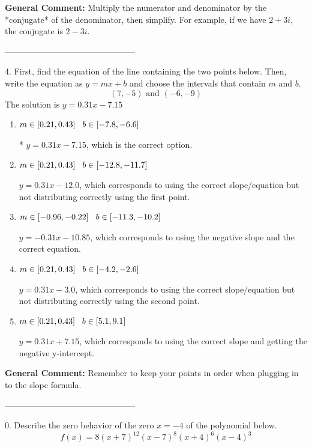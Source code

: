 \documentclass{extbook}[14pt]
\begin{document}
\textbf{General Comment:} Multiply the numerator and denominator by the *conjugate* of the denominator, then simplify. For example, if we have $2+3i$, the conjugate is $2-3i$. 

-----------------------------------------------

4. First, find the equation of the line containing the two points below. Then, write the equation as $ y=mx+b $ and choose the intervals that contain $m$ and $b$.
\[ (7, -5) \text{ and } (-6, -9) \] 
The solution is $ y = 0.31x -7.15 $ 

\begin{enumerate}[label=\Alph*.] 
\item $ m \in [0.21, 0.43] \hspace*{3mm} b \in [-7.8, -6.6] $ 

 * $y = 0.31x -7.15$, which is the correct option. 
\item $ m \in [0.21, 0.43] \hspace*{3mm} b \in [-12.8, -11.7] $ 

  $y = 0.31x -12.0$, which corresponds to using the correct slope/equation but not distributing correctly using the first point. 
\item $ m \in [-0.96, -0.22] \hspace*{3mm} b \in [-11.3, -10.2] $ 

  $y = -0.31x -10.85$, which corresponds to using the negative slope and the correct equation. 
\item $ m \in [0.21, 0.43] \hspace*{3mm} b \in [-4.2, -2.6] $ 

  $y = 0.31x -3.0$, which corresponds to using the correct slope/equation but not distributing correctly using the second point. 
\item $ m \in [0.21, 0.43] \hspace*{3mm} b \in [5.1, 9.1] $ 

  $y = 0.31x + 7.15$, which corresponds to using the correct slope and getting the negative y-intercept. 
\end{enumerate} 
 
\textbf{General Comment:} Remember to keep your points in order when plugging in to the slope formula. 

-----------------------------------------------

0. Describe the zero behavior of the zero $x = -4$ of the polynomial below.
\[ f(x) = 8(x + 7)^{12}(x - 7)^{8}(x + 4)^{6}(x - 4)^{3} \] 
\end{document}
